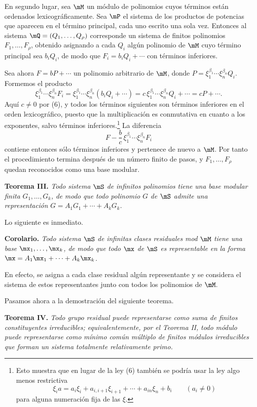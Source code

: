 \documentclass[11pt]{article}
\begin{document}
En segundo lugar, sea $\mM$ un módulo de polinomios cuyos términos están ordenados lexicográficamente. Sea $\mP$ el sistema de los productos de potencias que aparecen en el término principal, cada uno escrito una sola vez. Entonces al sistema $\mQ=(Q_1,\ldots,Q_\rho)$ corresponde un sistema de finitos polinomios $F_1,\ldots,F_\rho$, obtenido asignando a cada $Q_i$ algún polinomio de $\mM$ cuyo término principal sea $b_iQ_i$, de modo que $F_i=b_iQ_i+\cdots$ con términos inferiores.

Sea ahora $F=bP+\cdots$ un polinomio arbitrario de $\mM$, donde $P=\xi_1^{\beta_1}\cdots\xi_n^{\beta_n}Q_i$. Formemos el producto
\[
 \xi_1^{\beta_1}\cdots\xi_n^{\beta_n}F_i
 =\xi_1^{\beta_1}\cdots\xi_n^{\beta_n}(b_iQ_i+\cdots)
 =c\,\xi_1^{\beta_1}\cdots\xi_n^{\beta_n}Q_i+\cdots
 =cP+\cdots.
\]
Aquí $c\ne0$ por (6), y todos los términos siguientes son términos inferiores en el orden lexicográfico, puesto que la multiplicación es conmutativa en cuanto a los exponentes, salvo términos inferiores.\footnote{Esto muestra que en lugar de la ley (6) también se podría usar la ley algo menos restrictiva
\[
 \xi_i a=a_i\xi_i+a_{i,i+1}\xi_{i+1}+\cdots+a_{in}\xi_n+b_i\qquad(a_i\ne0)
\]
para alguna numeración fija de las $\xi$.} La diferencia
\[
 F-\frac bc\,\xi_1^{\beta_1}\cdots\xi_n^{\beta_n}F_i
\]
contiene entonces sólo términos inferiores y pertenece de nuevo a $\mM$. Por tanto el procedimiento termina después de un número finito de pasos, y $F_1,\ldots,F_\rho$ quedan reconocidos como una base modular.

\textbf{Teorema III.} \emph{Todo sistema $\mS$ de infinitos polinomios tiene una base modular finita $G_1,\ldots,G_k$, de modo que todo polinomio $G$ de $\mS$ admite una representación $G=A_1G_1+\cdots+A_kG_k$.}

Lo siguiente es inmediato.

\textbf{Corolario.} \emph{Todo sistema $\mS$ de infinitas clases residuales mod $\mM$ tiene una base $\mx_1,\ldots,\mx_k$, de modo que todo $\mx$ de $\mS$ es representable en la forma $\mx=A_1\mx_1+\cdots+A_k\mx_k$.}

En efecto, se asigna a cada clase residual algún representante y se considera el sistema de estos representantes junto con todos los polinomios de $\mM$.

Pasamos ahora a la demostración del siguiente teorema.

\textbf{Teorema IV.} \emph{Todo grupo residual puede representarse como suma de finitos constituyentes irreducibles; equivalentemente, por el Teorema II, todo módulo puede representarse como mínimo común múltiplo de finitos módulos irreducibles que forman un sistema totalmente relativamente primo.}
\end{document}
